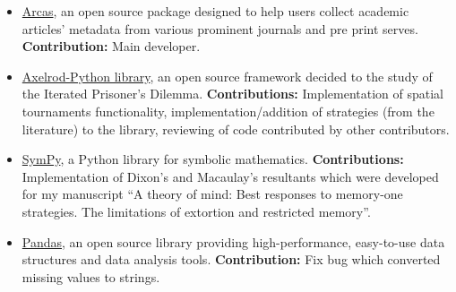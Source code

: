 \begin{itemize}
\item \href{https://github.com/ArcasProject/Arcas}{Arcas}, an open source
package designed to help users collect academic articles' metadata from
various prominent journals and pre print serves.
\textbf{Contribution:} Main developer.

\item \href{https://github.com/Axelrod-Python}{Axelrod-Python
library}, an open source framework decided to the study of the
Iterated Prisoner's Dilemma.
\textbf{Contributions:} Implementation of spatial tournaments functionality,
	implementation/addition of strategies (from the literature) to the library,
	reviewing of code contributed by other contributors.

\item \href{https://www.sympy.org/en/index.html}{SymPy},
a Python library for symbolic mathematics.
\textbf{Contributions:} Implementation of Dixon's and Macaulay's resultants
which were developed for my manuscript ``A theory of mind: Best responses to
memory-one strategies. The limitations of extortion and restricted memory''.

\item\href{https://pandas.pydata.org}{Pandas}, an open source library providing
high-performance, easy-to-use data structures and data analysis tools.
\textbf{Contribution:} Fix bug which converted missing values to strings.
\end{itemize}